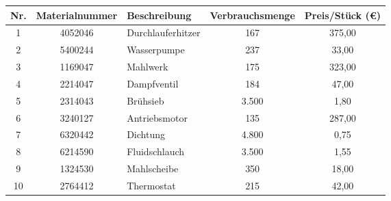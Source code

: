 \begin{table}[H]
\centering
\renewcommand{\arraystretch}{1.5}
\begin{tabularx}{\linewidth}{|c|c|X|c|c|}
\hline
\textbf{Nr.} & \textbf{Materialnummer} & \textbf{Beschreibung} & \textbf{Verbrauchsmenge} & \textbf{Preis/Stück (€)} \\
\hline
1 & 4052046 & Durchlauferhitzer & 167 & 375,00 \\
2 & 5400244 & Wasserpumpe & 237 & 33,00 \\
3 & 1169047 & Mahlwerk & 175 & 323,00 \\
4 & 2214047 & Dampfventil & 184 & 47,00 \\
5 & 2314043 & Brühsieb & 3.500 & 1,80 \\
6 & 3240127 & Antriebsmotor & 135 & 287,00 \\
7 & 6320442 & Dichtung & 4.800 & 0,75 \\
8 & 6214590 & Fluidschlauch & 3.500 & 1,55 \\
9 & 1324530 & Mahlscheibe & 350 & 18,00 \\
10 & 2764412 & Thermostat & 215 & 42,00 \\
\hline
\end{tabularx}
\end{table}

